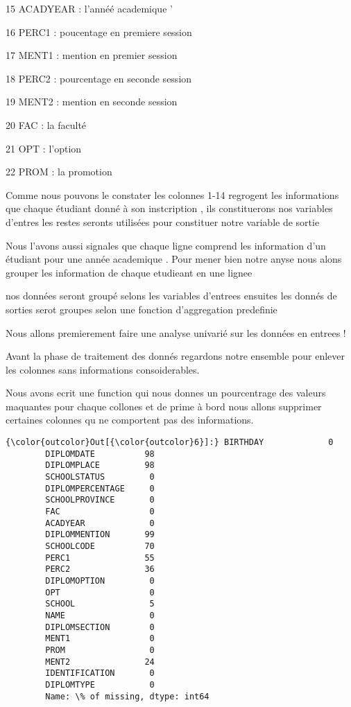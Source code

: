 \documentclass[11pt]{article}
\begin{document}
15 ACADYEAR : l'annéé academique '

16 PERC1 : poucentage en premiere session

17 MENT1 : mention en premier session

18 PERC2 : pourcentage en seconde session

19 MENT2 : mention en seconde session

20 FAC : la faculté

21 OPT : l'option

22 PROM : la promotion

    Comme nous pouvons le constater les colonnes 1-14 regrogent les
informations que chaque étudiant donné à son instcription , ils
constituerons nos variables d'entres les restes seronts utilisées pour
constituer notre variable de sortie

    Nous l'avons aussi signales que chaque ligne comprend les information
d'un étudiant pour une année academique . Pour mener bien notre anyse
nous alons grouper les information de chaque etudieant en une lignee

    nos données seront groupé selons les variables d'entrees ensuites les
donnés de sorties serot groupes selon une fonction d'aggregation
predefinie

    Nous allons premierement faire une analyse univarié sur les données en
entrees !

    Avant la phase de traitement des donnés regardons notre ensemble pour
enlever les colonnes sans informations consoiderables.

    Nous avons ecrit une function qui nous donnes un pourcentrage des
valeurs maquantes pour chaque collones et de prime à bord nous allons
supprimer certaines colonnes qu ne comportent pas des informations.

            \begin{Verbatim}[commandchars=\\\{\}]
{\color{outcolor}Out[{\color{outcolor}6}]:} BIRTHDAY             0
        DIPLOMDATE          98
        DIPLOMPLACE         98
        SCHOOLSTATUS         0
        DIPLOMPERCENTAGE     0
        SCHOOLPROVINCE       0
        FAC                  0
        ACADYEAR             0
        DIPLOMMENTION       99
        SCHOOLCODE          70
        PERC1               55
        PERC2               36
        DIPLOMOPTION         0
        OPT                  0
        SCHOOL               5
        NAME                 0
        DIPLOMSECTION        0
        MENT1                0
        PROM                 0
        MENT2               24
        IDENTIFICATION       0
        DIPLOMTYPE           0
        Name: \% of missing, dtype: int64
\end{Verbatim}
        
\end{document}
